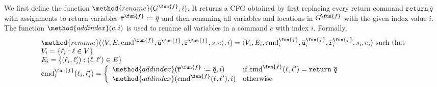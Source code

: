 We first define the function $\method{rename}(G^\fun{f},i)$.
It returns a CFG obtained by first replacing every return command
$\mathtt{return}\ \overline{q}$ with assignments to return variables
$\overline{\texttt{r}}^\fun{f} := \overline{q}$ and then renaming all variables
and locations in $G^\fun{f}$ with the given index value $i$.
The function $\method{addindex}(c, i)$ is used to rename all variables in a
command $c$ with index $i$.
Formally,
\[
\begin{array}{l}
\method{rename}(\langle V, E,\textmd{cmd}^\fun{f},\overline{\texttt{u}}^\fun{f},
\overline{\texttt{r}}^\fun{f},s,e \rangle,i)
= \langle V_i, E_i,\textmd{cmd}_i^\fun{f},\overline{\texttt{u}}_i^\fun{f},
\overline{\texttt{r}}_i^\fun{f},s_i,e_i \rangle \text{ such that}\\

V_i = \{\ell_i:\ell \in V\} \\

E_i = \{(\ell_i,\ell'_i): (\ell,\ell') \in E\} \\

\textmd{cmd}_i^\fun{f}(\ell_i,\ell'_i) =
  \left\{
  \begin{array}{ll}
   \method{addindex}(\overline{\texttt{r}}^\fun{f}:=\overline{q}, i) &
     \text{if }\textmd{cmd}^\fun{f}(\ell,\ell')=\mathtt{return}\ \overline{q} \\
   \method{addindex}(\textmd{cmd}^\fun{f}(\ell,\ell'), i) &
     \text{otherwise}
  \end{array}
  \right.
\end{array}
\]

